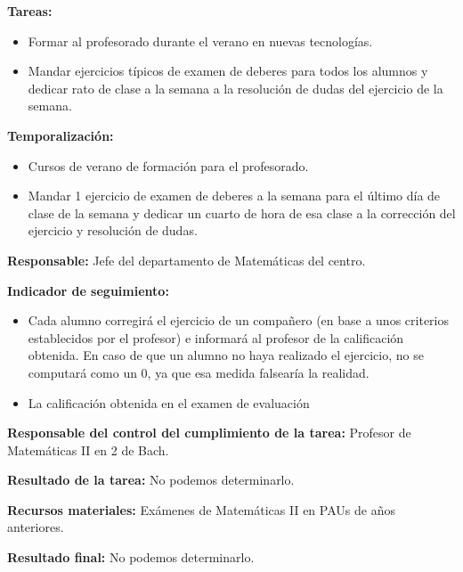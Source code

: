 \textbf{Tareas:}
\vspace{-0.3cm}
\begin{itemize}
	\item Formar al profesorado durante el verano en nuevas tecnologías.
	\item Mandar ejercicios típicos de examen de deberes para todos los alumnos y dedicar rato de clase a la semana a la resolución de dudas del ejercicio de la semana.
\end{itemize}


\textbf{Temporalización:}
\vspace{-0.3cm}
\begin{itemize}
	\item Cursos de verano de formación para el profesorado.
	\item Mandar 1 ejercicio de examen de deberes a la semana para el último día de clase de la semana y dedicar un cuarto de hora de esa clase a la corrección del ejercicio y resolución de dudas.
\end{itemize}

\textbf{Responsable:}
Jefe del departamento de Matemáticas del centro.

\textbf{Indicador de seguimiento:}
\vspace{-0.3cm}
\begin{itemize}
	\item Cada alumno corregirá el ejercicio de un compañero (en base a unos criterios establecidos por el profesor) e informará al profesor de la calificación obtenida.
	\subitem En caso de que un alumno no haya realizado el ejercicio, no se computará como un 0, ya que esa medida falsearía la realidad.
	\item La calificación obtenida en el examen de evaluación 
\end{itemize}

\textbf{Responsable del control del cumplimiento de la tarea:}
Profesor de Matemáticas II en 2 de Bach.

\textbf{Resultado de la tarea:}
No podemos determinarlo.

\textbf{Recursos materiales:}
Exámenes de Matemáticas II en PAUs de años anteriores.

\textbf{Resultado final:}
No podemos determinarlo.